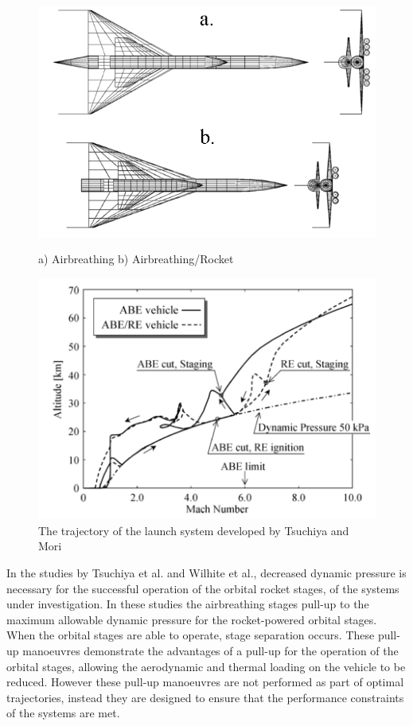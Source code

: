 \begin{figure}
	\centering
	\begin{minipage}[b]{0.45\textwidth}
		\centering
		\includegraphics[width=\linewidth]{"figures/2_literature-review/Tsuchiya Vehicles"}
		\caption{a) Airbreathing b) Airbreathing/Rocket}
		\label{fig:TsuchiyaVehicle}
	\end{minipage}	
	\begin{minipage}[b]{0.45\textwidth}
		\includegraphics[width=\linewidth]{"figures/2_literature-review/Tsuchiya"}
		\caption{The trajectory of the launch system developed by Tsuchiya and Mori \cite{Tsuchiya2005}}
		\label{fig:TsuchiyaTrajectory}
	\end{minipage}
\end{figure}
In the studies by Tsuchiya et al.\cite{Tsuchiya2005} and Wilhite et al.\cite{Wilhite1991}, decreased dynamic pressure is necessary for the successful operation of the orbital rocket stages, of the systems under investigation. In these studies the airbreathing stages pull-up to the maximum allowable dynamic pressure for the rocket-powered orbital stages. When the orbital stages are able to operate, stage separation occurs. These pull-up manoeuvres demonstrate the advantages of a pull-up for the operation of the orbital stages, allowing the aerodynamic and thermal loading on the vehicle to be reduced. However these pull-up manoeuvres are not performed as part of optimal trajectories, instead they are designed to ensure that the performance constraints of the systems are met. 
